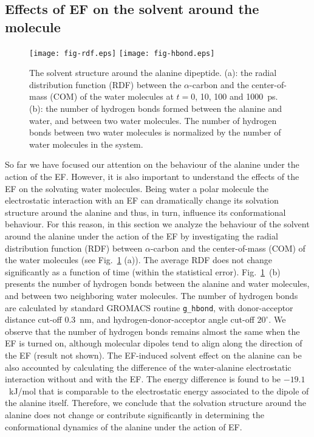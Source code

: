 \documentclass[journal=jctcce,manuscript=manuscript]{achemso}
\begin{document}
\subsection{Effects of EF on the solvent around the molecule}

\begin{figure}
  \centering
  \texttt{[image: fig-rdf.eps]}
  \texttt{[image: fig-hbond.eps]}
  \caption{The solvent structure around the alanine dipeptide.  
    (a): the radial distribution function (RDF) between the
    $\alpha$-carbon and the center-of-mass (COM) of the water molecules at
    $t = 0$, 10, 100 and 1000~ps.  (b): the number of hydrogen
    bonds formed between the alanine and water, and between two water
    molecules.  The number of hydrogen bonds between two water
    molecules is normalized by the number of water molecules in the
    system. 
  }
  \label{fig:tmp7a}
\end{figure}
So far we have focused our attention on the behaviour of the alanine
under the action of the EF. However, it is also important to understand
the effects of the EF on the solvating water molecules. Being water a
polar molecule the electrostatic interaction with an EF can
dramatically change its solvation structure around the alanine and
thus, in turn, influence its conformational behaviour. For this
reason, in this section we analyze the behaviour of the solvent around
the alanine under the action of the EF by investigating
the radial distribution function (RDF) between $\alpha$-carbon and the
center-of-mass (COM) of the water molecules
(see Fig.~\ref{fig:tmp7a} (a)). The average
RDF does not change significantly as a function of time
(within the statistical error). 
Fig.~\ref{fig:tmp7a}~(b) presents the number of hydrogen bonds between the
alanine and water molecules, and between two neighboring water molecules.
The number of hydrogen bonds are calculated by standard GROMACS
routine {\texttt {g\_hbond}}, with donor-acceptor distance cut-off 0.3~nm,
and hydrogen-donor-acceptor angle cut-off $20^{\circ}$.
We observe that the
number of hydrogen bonds remains almost the same when the EF is turned on,
although molecular dipoles tend to align along the direction of the EF (result
not shown). 
The EF-induced solvent effect on the alanine can be also accounted by calculating the
difference of the water-alanine electrostatic interaction 
without and with the EF.
The energy difference is found to be $-19.1$~kJ/mol that is
comparable to the electrostatic energy associated to the dipole of the alanine itself.
Therefore, we conclude that the solvation structure around the
alanine does not change or contribute significantly in determining the conformational dynamics of the alanine under the action of EF.
\end{document}
